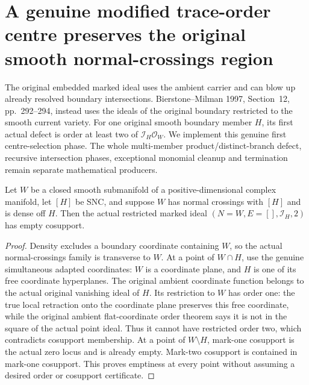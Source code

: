 \section{A genuine modified trace-order centre preserves the original smooth normal-crossings region}

The original embedded marked ideal uses the ambient carrier and can blow up
already resolved boundary intersections. Bierstone--Milman 1997,
Section~12, pp.~292--294, instead uses the ideals of the original boundary
restricted to the smooth current variety. For one original smooth boundary
member $H$, its first actual defect is order at least two of
$\mathcal I_H\mathcal O_W$. We implement this genuine first centre-selection
phase. The whole multi-member product/distinct-branch defect, recursive
intersection phases, exceptional monomial cleanup and termination remain
separate mathematical producers.

\begin{lemma}
\label{hir:sharp-single-boundary-transverse-trace-order-one}
\leanok
Let $W$ be a closed smooth submanifold of a positive-dimensional complex
manifold, let $[H]$ be SNC, and suppose $W$ has normal crossings with $[H]$
and is dense off $H$. Then the actual restricted marked ideal
$(N=W,E=[],\mathcal I_H,2)$ has empty cosupport.
\end{lemma}
\begin{proof}
Density excludes a boundary coordinate containing $W$, so the actual
normal-crossings family is transverse to $W$. At a point of $W\cap H$, use
the genuine simultaneous adapted coordinates: $W$ is a coordinate plane,
and $H$ is one of its free coordinate hyperplanes. The original ambient
coordinate function belongs to the actual original vanishing ideal of
$H$. Its restriction to $W$ has order one: the true local retraction onto
the coordinate plane preserves this free coordinate, while the original
ambient flat-coordinate order theorem says it is not in the square of
the actual point ideal. Thus it cannot have restricted order two, which
contradicts cosupport membership. At a point of $W\setminus H$, mark-one
cosupport is the actual zero locus and is already empty. Mark-two
cosupport is contained in mark-one cosupport. This proves emptiness at
every point without assuming a desired order or cosupport certificate.
\end{proof}

